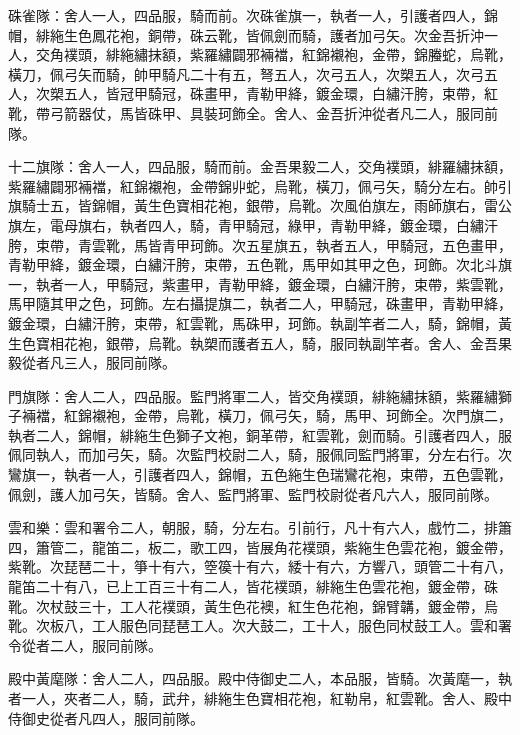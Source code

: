 \begin{pinyinscope}
 硃雀隊：舍人一人，四品服，騎而前。次硃雀旗一，執者一人，引護者四人，錦帽，緋絁生色鳳花袍，銅帶，硃云靴，皆佩劍而騎，護者加弓矢。次金吾折沖一人，交角襆頭，緋絁繡抹額，紫羅繡闢邪裲襠，紅錦襯袍，金帶，錦螣蛇，烏靴，橫刀，佩弓矢而騎，帥甲騎凡二十有五，弩五人，次弓五人，次槊五人，次弓五人，次槊五人，皆冠甲騎冠，硃畫甲，青勒甲絳，鍍金環，白繡汗胯，束帶，紅靴，帶弓箭器仗，馬皆硃甲、具裝珂飾全。舍人、金吾折沖從者凡二人，服同前隊。



 十二旗隊：舍人一人，四品服，騎而前。金吾果毅二人，交角襆頭，緋羅繡抹額，紫羅繡闢邪裲襠，紅錦襯袍，金帶錦丱蛇，烏靴，橫刀，佩弓矢，騎分左右。帥引旗騎士五，皆錦帽，黃生色寶相花袍，銀帶，烏靴。次風伯旗左，雨師旗右，雷公旗左，電母旗右，執者四人，騎，青甲騎冠，綠甲，青勒甲絳，鍍金環，白繡汗胯，束帶，青雲靴，馬皆青甲珂飾。次五星旗五，執者五人，甲騎冠，五色畫甲，青勒甲絳，鍍金環，白繡汗胯，束帶，五色靴，馬甲如其甲之色，珂飾。次北斗旗一，執者一人，甲騎冠，紫畫甲，青勒甲絳，鍍金環，白繡汗胯，束帶，紫雲靴，馬甲隨其甲之色，珂飾。左右攝提旗二，執者二人，甲騎冠，硃畫甲，青勒甲絳，鍍金環，白繡汗胯，束帶，紅雲靴，馬硃甲，珂飾。執副竿者二人，騎，錦帽，黃生色寶相花袍，銀帶，烏靴。執槊而護者五人，騎，服同執副竿者。舍人、金吾果毅從者凡三人，服同前隊。



 門旗隊：舍人二人，四品服。監門將軍二人，皆交角襆頭，緋絁繡抹額，紫羅繡獅子裲襠，紅錦襯袍，金帶，烏靴，橫刀，佩弓矢，騎，馬甲、珂飾全。次門旗二，執者二人，錦帽，緋絁生色獅子文袍，銅革帶，紅雲靴，劍而騎。引護者四人，服佩同執人，而加弓矢，騎。次監門校尉二人，騎，服佩同監門將軍，分左右行。次鸞旗一，執者一人，引護者四人，錦帽，五色絁生色瑞鸞花袍，束帶，五色雲靴，佩劍，護人加弓矢，皆騎。舍人、監門將軍、監門校尉從者凡六人，服同前隊。



 雲和樂：雲和署令二人，朝服，騎，分左右。引前行，凡十有六人，戲竹二，排簫四，簫管二，龍笛二，板二，歌工四，皆展角花襆頭，紫絁生色雲花袍，鍍金帶，紫靴。次琵琶二十，箏十有六，箜篌十有六，緌十有六，方響八，頭管二十有八，龍笛二十有八，已上工百三十有二人，皆花襆頭，緋絁生色雲花袍，鍍金帶，硃靴。次杖鼓三十，工人花襆頭，黃生色花襖，紅生色花袍，錦臂韝，鍍金帶，烏靴。次板八，工人服色同琵琶工人。次大鼓二，工十人，服色同杖鼓工人。雲和署令從者二人，服同前隊。



 殿中黃麾隊：舍人二人，四品服。殿中侍御史二人，本品服，皆騎。次黃麾一，執者一人，夾者二人，騎，武弁，緋絁生色寶相花袍，紅勒帛，紅雲靴。舍人、殿中侍御史從者凡四人，服同前隊。




\end{pinyinscope}
